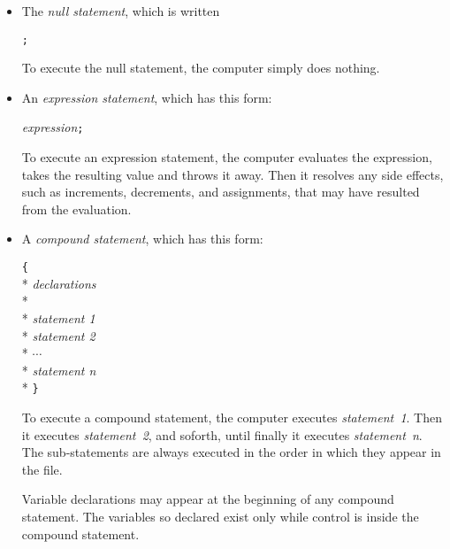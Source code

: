 \begin{itemize}

\item The {\em null statement}\/, which is written

\begin{flushleft}
{\tt ;}
\end{flushleft}

To execute the null statement, the computer simply does nothing.

\item An {\em expression statement}\/, which has this form:

\begin{flushleft}
{\em expression}\/{\tt ;}
\end{flushleft}

To execute an expression statement, the computer evaluates the
expression, takes the resulting value and throws it away.  Then it
resolves any side effects, such as increments, decrements, and
assignments, that may have resulted from the evaluation.


\item A {\em compound statement}\/, which has this form:

\begin{flushleft}
{\tt \{} \\*
{\hspace{8pt}\em declarations} \\*
{\hspace{8pt}}\\*
{\hspace{8pt}\em statement 1} \\*
{\hspace{8pt}\em statement 2} \\*
{\hspace{8pt} $\cdots$} \\*
{\hspace{8pt}\em statement n} \\*
{\tt \}}
\end{flushleft}

To execute a compound statement, the computer executes {\em
statement~1}\/.  Then it executes {\em statement~2}\/, and soforth,
until finally it executes {\em statement~n}\/.  The sub-statements are
always executed in the order in which they appear in the file.

Variable declarations may appear at the beginning of any compound
statement.  The variables so declared exist only while control is inside
the compound statement.


\end{itemize}

